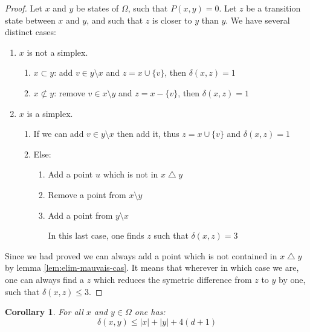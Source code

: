 \documentclass[11pt]{article}
\newtheorem{corollary}{Corollary}[subsection]
\begin{document}
\begin{proof}
  Let $x$ and $y$ be states of $\Omega$, such that $P(x,y)=0$. Let $z$ be a transition state between $x$ and $y$, and such that $z$ is closer to $y$ than $y$. We have several distinct cases:

  \begin{enumerate}
    \item $x$ is not a simplex.
    \begin{enumerate}
      \item $x \subset y$: add $v \in y \setminus x$ and $z = x \cup \{v\}$, then $\delta(x,z) = 1$
      \item $x \not\subset y$: remove $v \in x \setminus y$ and $z = x - \{v\}$, then $\delta(x,z) = 1$
    \end{enumerate}
    \item $x$ is a simplex.
    \begin{enumerate}
      \item If we can add $v \in y \setminus x$ then add it, thus $z = x \cup \{v\}$ and $\delta(x,z) = 1$
      \item Else:
      \begin{enumerate}
        \item Add a point $u$ which is not in $x \bigtriangleup y$
        \item Remove a point from  $x \setminus y$
        \item Add  a point from $y \setminus x$

        In this last case, one finds $z$ such that $\delta(x,z) = 3$
      \end{enumerate}
    \end{enumerate}
  \end{enumerate}

  Since we had proved we can always add a point which is not contained in $x \bigtriangleup y$ by lemma \ref{lem:elim-mauvais-cas}. It means that wherever in which case we are, one can always find a $z$ which reduces the symetric difference from $z$ to $y$ by one, such that $\delta(x,z) \leq{3}$.

\end{proof}

\begin{corollary}\label{coro:diameter}
  For all $x$ and $y \in \Omega$ one has:
  \begin{equation}
    \delta(x,y) \leq |x| + |y| + 4(d+1)
  \end{equation}
\end{corollary}
\end{document}
